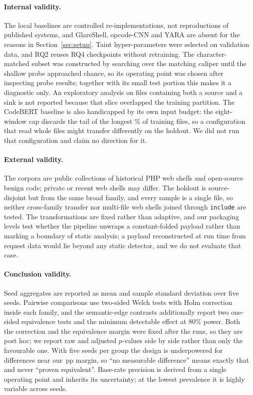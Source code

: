 \documentclass[pdflatex,sn-mathphys-num]{sn-jnl}
\begin{document}
\paragraph{Internal validity.} The local baselines are controlled
re-implementations, not reproductions of published systems, and GlareShell,
opcode-CNN and YARA are absent for the reasons in
Section~\ref{sec:setup}. Taint hyper-parameters were selected on validation
data, and RQ2 reuses RQ4 checkpoints without retraining. The character-matched
subset was constructed by searching over the matching caliper until the shallow
probe approached chance, so its operating point was chosen after inspecting
probe results; together with its small test portion this makes it a diagnostic
only. An exploratory analysis on files containing both a source and a sink is
not reported because that slice overlapped the training partition. The CodeBERT
baseline is also handicapped by its own input budget: the eight-window cap
discards the tail of the longest \CodeBertTruncatedTrainPct\% of training
files, so a configuration that read whole files might transfer differently on
the holdout. We did not run that configuration and claim no direction for it.

\paragraph{External validity.} The corpora are public collections of historical
PHP web shells and open-source benign code; private or recent web shells may
differ. The holdout is source-disjoint but from the same broad family, and
every sample is a single file, so neither cross-family transfer nor multi-file
web shells joined through \texttt{include} are tested. The transformations are
fixed rather than adaptive, and our packaging levels test whether the pipeline
unwraps a constant-folded payload rather than marking a boundary of static
analysis; a payload reconstructed at run time from request data would lie
beyond any static detector, and we do not evaluate that case.

\paragraph{Conclusion validity.} Seed aggregates are reported as mean and
sample standard deviation over five seeds. Pairwise comparisons use two-sided
Welch tests with Holm correction inside each family, and the semantic-edge
contrasts additionally report two one-sided equivalence tests and the minimum
detectable effect at 80\% power. Both the correction and the equivalence
margin were fixed after the runs, so they are post hoc; we report raw and
adjusted $p$-values side by side rather than only the favourable one. With five
seeds per group the design is underpowered for differences near our
\TaintSesoiPp\,pp margin, so ``no measurable difference'' means exactly that
and never ``proven equivalent''. Base-rate precision is derived from a single
operating point and inherits its uncertainty; at the lowest prevalence it is
highly variable across seeds.
\end{document}
